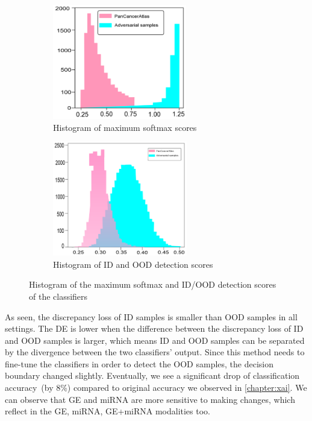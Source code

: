 \begin{figure}[h]
	\centering
	\begin{subfigure}{.48\linewidth}
		\centering
		\includegraphics[width=\linewidth,height=50mm]{images/ood_detection.png}
		\caption{Histogram of maximum softmax scores}
        \label{fig:max_soft_score}
	\end{subfigure}
	\begin{subfigure}{0.48\linewidth}
		\centering
		\includegraphics[width=\linewidth,height=50mm]{images/hist_max_softmax.png}
		\caption{Histogram of ID and OOD detection scores}
		\label{fig:id_ood_de_scores}
	\end{subfigure}
	\caption{Histogram of the maximum softmax and ID/OOD detection scores of the classifiers} 
	\label{fig:max_soft_scores_and_de_scores}
\end{figure}

\hspace*{3.5mm} As seen, the discrepancy loss of ID samples is smaller than OOD samples in all settings. The DE is lower when the difference between the discrepancy loss of ID and OOD samples is larger, which means ID and OOD samples can be separated by the divergence between the two classifiers' output. Since this method needs to fine-tune the classifiers in order to detect the OOD samples, the decision boundary changed slightly. Eventually, we see a significant drop of classification accuracy~(by 8\%) compared to original accuracy we observed in \cref{chapter:xai}. We can observe that GE and miRNA are more sensitive to making changes, which reflect in the GE, miRNA, GE+miRNA modalities too. 

